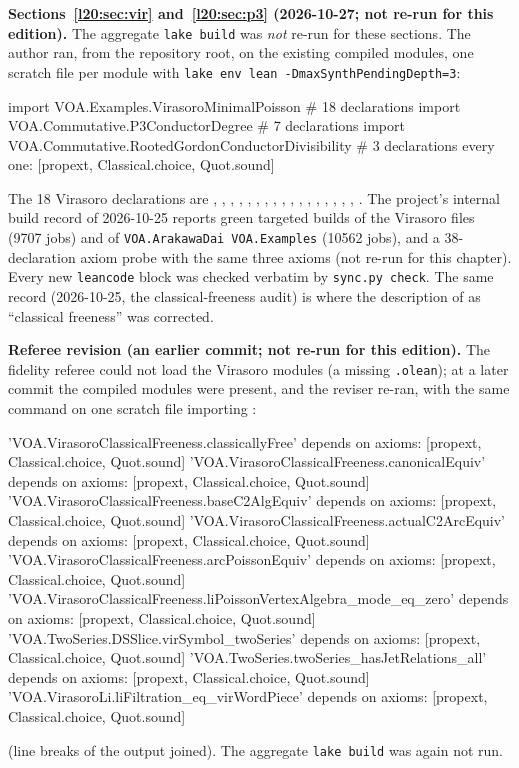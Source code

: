 \textbf{Sections~\ref{l20:sec:vir} and~\ref{l20:sec:p3} (2026-10-27; not re-run for this edition).} The aggregate
\texttt{lake build} was \emph{not} re-run for these sections. The author ran, from the repository root, on the existing compiled
modules, one scratch file per module with \texttt{lake env lean -DmaxSynthPendingDepth=3}:
\begin{plaincode}
import VOA.Examples.VirasoroMinimalPoisson      # 18 declarations
import VOA.Commutative.P3ConductorDegree        # 7 declarations
import VOA.Commutative.RootedGordonConductorDivisibility   # 3 declarations
  every one: [propext, Classical.choice, Quot.sound]
\end{plaincode}
The 18 Virasoro declarations are , ,
, , , , ,
, , , , , ,
, , , ,
. The project's internal build record of 2026-10-25 reports green targeted builds of the Virasoro files (9707 jobs) and of
\texttt{VOA.ArakawaDai VOA.Examples} (10562 jobs), and a 38-declaration axiom probe with the same three axioms (not re-run for this chapter). Every new
\texttt{leancode} block was checked verbatim by \texttt{sync.py check}. The same record (2026-10-25, the
classical-freeness audit) is where the description of  as ``classical freeness'' was corrected.

\textbf{Referee revision (an earlier commit; not re-run for this edition).} The fidelity referee could not load the
Virasoro modules (a missing \texttt{.olean}); at a later commit the compiled modules were present, and the reviser re-ran, with the same command on one scratch
file importing :
\begin{plaincode}
'VOA.VirasoroClassicalFreeness.classicallyFree' depends on axioms: [propext, Classical.choice, Quot.sound]
'VOA.VirasoroClassicalFreeness.canonicalEquiv' depends on axioms: [propext, Classical.choice, Quot.sound]
'VOA.VirasoroClassicalFreeness.baseC2AlgEquiv' depends on axioms: [propext, Classical.choice, Quot.sound]
'VOA.VirasoroClassicalFreeness.actualC2ArcEquiv' depends on axioms: [propext, Classical.choice, Quot.sound]
'VOA.VirasoroClassicalFreeness.arcPoissonEquiv' depends on axioms: [propext, Classical.choice, Quot.sound]
'VOA.VirasoroClassicalFreeness.liPoissonVertexAlgebra_mode_eq_zero' depends on axioms: [propext, Classical.choice, Quot.sound]
'VOA.TwoSeries.DSSlice.virSymbol_twoSeries' depends on axioms: [propext, Classical.choice, Quot.sound]
'VOA.TwoSeries.twoSeries_hasJetRelations_all' depends on axioms: [propext, Classical.choice, Quot.sound]
'VOA.VirasoroLi.liFiltration_eq_virWordPiece' depends on axioms: [propext, Classical.choice, Quot.sound]
\end{plaincode}
(line breaks of the output joined). The aggregate \texttt{lake build} was again not run.

